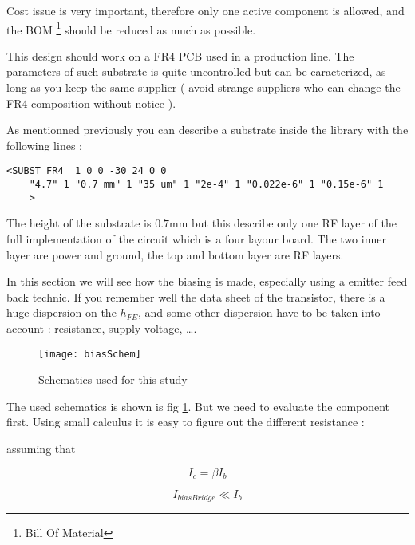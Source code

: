 Cost issue is very important, therefore only one active component is allowed, and the BOM \footnote{Bill Of Material} should be reduced as much as possible.

\bigskip

This design should work on a FR4 PCB used in a production line. The parameters of such substrate is quite uncontrolled but can be caracterized, as long as you keep the same supplier ( avoid strange suppliers who can change the FR4 composition without notice ).

As mentionned previously you can describe a substrate inside the library with the following lines :

\begin{verbatim}
<SUBST FR4_ 1 0 0 -30 24 0 0 
	"4.7" 1 "0.7 mm" 1 "35 um" 1 "2e-4" 1 "0.022e-6" 1 "0.15e-6" 1
	>
\end{verbatim}

The height of the substrate is $0.7$mm but this describe only one RF layer of the full implementation of the circuit which is a four layour board. The two inner layer are power and ground, the top and bottom layer are RF layers.



In this section we will see how the biasing is made, especially using a emitter feed back technic. If you remember well the data sheet of the transistor, there is a huge dispersion on the $h_{FE}$, and some other dispersion have to be taken into account : resistance, supply voltage, \ldots.

\begin{figure}[htbp]
\begin{center}
	\texttt{[image: biasSchem]}
	\caption{Schematics used for this study}
	\label{design:pa:bias:schema}
\end{center}
\end{figure}

The used schematics is shown is fig \ref{design:pa:bias:schema}. But we need to evaluate the component first. Using small calculus it is easy to figure out the different resistance :

assuming that 

\begin{equation}
I_c = \beta I_b 
\end{equation}

\begin{equation}
I_{biasBridge} \ll I_b
\end{equation}

